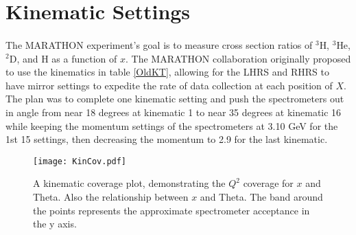 
\section{Kinematic Settings}\label{sec:kin}
\paragraph{} The MARATHON experiment's goal is to measure cross section ratios of $^3$H, $^3$He, $^2$D, and H as a function of $x$. The MARATHON collaboration originally proposed to use the kinematics in table \ref{OldKT}, allowing for the LHRS and RHRS to have mirror settings to expedite the rate of data collection at each position of $X$. The plan was to complete one kinematic setting and push the spectrometers out in angle from near 18 degrees at kinematic 1 to near 35 degrees at kinematic 16 while keeping the momentum settings of the spectrometers at 3.10 GeV for the 1st 15 settings, then decreasing the momentum to 2.9 for the last kinematic. 
\begin{figure}[t]
	\centering
	\texttt{[image: KinCov.pdf]}
	\caption{A kinematic coverage plot, demonstrating the $Q^2$ coverage for $x$ and Theta. Also the relationship between $x$ and Theta. The band around the points represents the approximate spectrometer acceptance in the y axis.}
	\label{fig:kincov}
\end{figure}  

